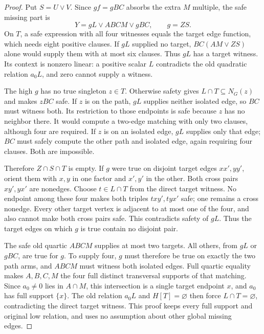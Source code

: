 \documentclass[11pt]{article}
\theoremstyle{definition}
\theoremstyle{remark}
\begin{document}
\begin{proof}
Put $S=U\vee V$. Since $gf=gBC$ absorbs the extra $M$ multiple, the safe missing part is
\[
                 Y=gL\vee ABCM\vee gBC,\qquad g=ZS.
\]
On $T$, a safe expression with all four witnesses equals the target edge function, which needs eight positive clauses. If $gL$ supplied no target, $BC(AM\vee ZS)$ alone would supply them with at most six clauses. Thus $gL$ has a target witness. Its context is nonzero linear: a positive scalar $L$ contradicts the old quadratic relation $a_0L$, and zero cannot supply a witness.

The high $g$ has no true singleton $z\in T$. Otherwise safety gives $L\cap T\subseteq N_G(z)$ and makes $zBC$ safe. If $z$ is on the path, $gL$ supplies neither isolated edge, so $BC$ must witness both. Its restriction to those endpoints is safe because $z$ has no neighbor there. It would compute a two-edge matching with only two clauses, although four are required. If $z$ is on an isolated edge, $gL$ supplies only that edge; $BC$ must safely compute the other path and isolated edge, again requiring four clauses. Both are impossible.

Therefore $Z\cap S\cap T$ is empty. If $g$ were true on disjoint target edges $xx',yy'$, orient them with $x,y$ in one factor and $x',y'$ in the other. Both cross pairs $xy',yx'$ are nonedges. Choose $t\in L\cap T$ from the direct target witness. No endpoint among these four makes both triples $txy',tyx'$ safe; one remains a cross nonedge. Every other target vertex is adjacent to at most one of the four, and also cannot make both cross pairs safe. This contradicts safety of $gL$. Thus the target edges on which $g$ is true contain no disjoint pair.

The safe old quartic $ABCM$ supplies at most two targets. All others, from $gL$ or $gBC$, are true for $g$. To supply four, $g$ must therefore be true on exactly the two path arms, and $ABCM$ must witness both isolated edges. Full quartic equality makes $A,B,C,M$ the four full distinct transversal supports of that matching. Since $a_0\ne0$ lies in $A\cap M$, this intersection is a single target endpoint $x$, and $a_0$ has full support $\{x\}$. The old relation $a_0L$ and $H[T]=\varnothing$ then force $L\cap T=\varnothing$, contradicting the direct target witness. This proof keeps every full support and original low relation, and uses no assumption about other global missing edges.
\end{proof}
\end{document}

